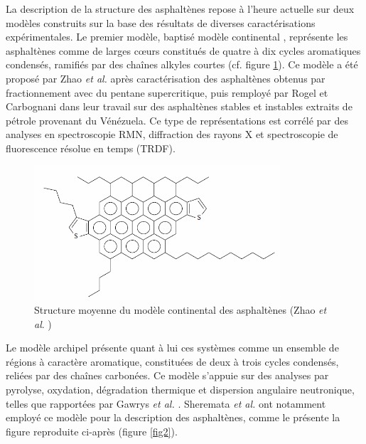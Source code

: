 La description de la structure des asphaltènes repose à l'heure actuelle sur deux modèles construits sur la base des résultats de diverses caractérisations expérimentales.  
Le premier modèle, baptisé modèle \og continental \fg, représente les asphaltènes comme de larges cœurs constitués de quatre à dix cycles aromatiques condensés, ramifiés par des chaînes alkyles courtes \cite{groenzin2000molecular} (cf. figure \ref{figZ1}). Ce modèle a été proposé par Zhao \textit{et al.} \cite{zhao2001molecular} après caractérisation des asphaltènes obtenus par fractionnement avec du pentane supercritique, puis remployé par Rogel et Carbognani \cite{rogel2003density} dans leur travail sur des asphaltènes stables et instables extraits de pétrole provenant du Vénézuela. 
Ce type de représentations est corrélé par des analyses en spectroscopie RMN, diffraction des rayons X et spectroscopie de fluorescence résolue en temps (TRDF). 



\begin{figure}[h!]
	\centering
	\includegraphics[height=5cm]{image/Zhao}
	\caption[Structure moyenne du modèle continental des asphaltènes]{Structure moyenne du modèle continental des asphaltènes (Zhao \textit{et al}. \cite{zhao2001molecular})}
	\label{figZ1}
\end{figure}


Le modèle \og archipel \fg{} présente quant à lui ces systèmes comme un ensemble de régions à caractère aromatique, constituées de deux à trois cycles condensés, reliées par des chaînes carbonées. Ce modèle s'appuie sur des analyses par pyrolyse, oxydation, dégradation thermique et dispersion angulaire neutronique, telles que rapportées par Gawrys \textit{et al.} \cite{gawrys2003role}. Sheremata \textit{et al.}\cite{sheremata2004quantitative} ont notamment employé ce modèle pour la description des asphaltènes, comme le présente la figure reproduite ci-après (figure \ref{fig2}). 


